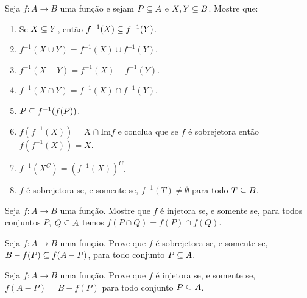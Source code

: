 \documentclass[12pt]{exam}
\begin{document}
    \questao{} Seja $f : A \to B$ uma fun{\c c}{\~a}o e sejam $P \subseteq
    A$ e $X, Y\subseteq B$. Mostre que:
    \begin{enumerate}[label={\alph*})]
        \item Se $X\subseteq Y$, ent{\~a}o $f^{-1}(X)\subseteq f^{-1}(Y)$.

        \item $f^{-1}(X\cup Y)=f^{-1}(X)\cup f^{-1}(Y)$.

        \item $f^{-1}(X - Y) = f^{-1}(X) - f^{-1}(Y)$.

        \item $f^{-1}(X\cap Y)= f^{-1}(X)\cap f^{-1}(Y)$.

        \item $P\subseteq f^{-1}(f(P))$.

        \item $f(f^{-1}(X))= X \cap \mbox{Im}f$ e conclua que se $f$ {\'e} sobrejetora ent{\~a}o
        $f(f^{-1}(X))=X$.
        \item $f^{-1}(X^C) = (f^{-1}(X))^C$.

        \item $f$ \'e sobrejetora se, e somente se, $f^{-1}(T) \ne \emptyset$ para todo $T \subseteq B$.
    \end{enumerate}

    \vspace{.3cm}

    \questao{} Seja $f : A \to B$ uma função. Mostre que $f$ é injetora se, e somente se, para todos conjuntos $P$, $Q \subseteq A$ temos $f(P \cap Q) = f(P) \cap f(Q)$.

    \vspace{.3cm}

    \questao{} Seja $f : A \to B$ uma função. Prove que $f$ é sobrejetora se, e somente se, $B - f(P) \subseteq f(A - P)$, para todo conjunto $P \subseteq A$.

    \vspace{.3cm}

    \questao{} Seja $f: A \to B$ uma função. Prove que $f$ é injetora se, e somente se, $f(A - P) = B - f(P)$ para todo conjunto $P \subseteq A$.
\end{document}

